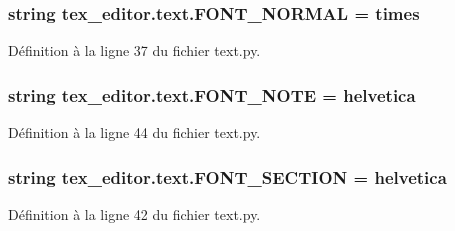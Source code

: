 \subsubsection[{F\+O\+N\+T\+\_\+\+N\+O\+R\+M\+A\+L}]{\setlength{\rightskip}{0pt plus 5cm}string tex\+\_\+editor.\+text.\+F\+O\+N\+T\+\_\+\+N\+O\+R\+M\+A\+L = \textquotesingle{}times\textquotesingle{}}\label{namespacetex__editor_1_1text_ae4abaacad25df0490b14871b84306412}


Définition à la ligne 37 du fichier text.\+py.

\hypertarget{namespacetex__editor_1_1text_a6ad5c54bf2484d9199d1b72c81e17ed7}{}
\subsubsection[{F\+O\+N\+T\+\_\+\+N\+O\+T\+E}]{\setlength{\rightskip}{0pt plus 5cm}string tex\+\_\+editor.\+text.\+F\+O\+N\+T\+\_\+\+N\+O\+T\+E = \textquotesingle{}helvetica\textquotesingle{}}\label{namespacetex__editor_1_1text_a6ad5c54bf2484d9199d1b72c81e17ed7}


Définition à la ligne 44 du fichier text.\+py.

\hypertarget{namespacetex__editor_1_1text_a6e4953aca7ce841dee2735d37705d653}{}
\subsubsection[{F\+O\+N\+T\+\_\+\+S\+E\+C\+T\+I\+O\+N}]{\setlength{\rightskip}{0pt plus 5cm}string tex\+\_\+editor.\+text.\+F\+O\+N\+T\+\_\+\+S\+E\+C\+T\+I\+O\+N = \textquotesingle{}helvetica\textquotesingle{}}\label{namespacetex__editor_1_1text_a6e4953aca7ce841dee2735d37705d653}


Définition à la ligne 42 du fichier text.\+py.

\hypertarget{namespacetex__editor_1_1text_ae74d39eb8742994b41f56541bc8bae6c}{}
